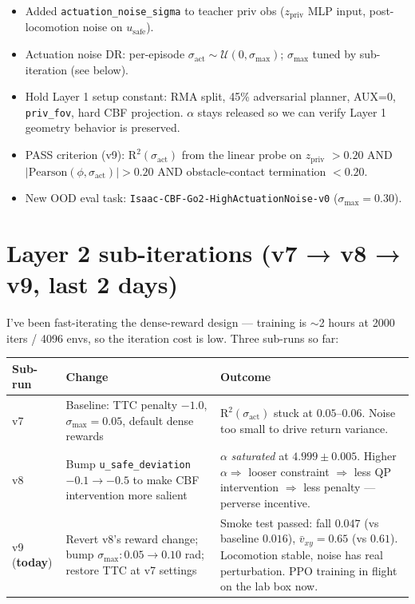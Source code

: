 \documentclass[11pt]{article}
\begin{document}
\begin{itemize}
\item Added \texttt{actuation\_noise\_sigma} to teacher priv obs ($z_\text{priv}$ MLP input, post-locomotion noise on $u_\text{safe}$).
\item Actuation noise DR: per-episode $\sigma_\text{act} \sim \mathcal{U}(0, \sigma_\text{max})$; $\sigma_\text{max}$ tuned by sub-iteration (see below).
\item Hold Layer 1 setup constant: RMA split, 45\% adversarial planner, AUX=0, \texttt{priv\_fov}, hard CBF projection. $\alpha$ stays released so we can verify Layer 1 geometry behavior is preserved.
\item PASS criterion (v9): $\text{R}^2(\sigma_\text{act})$ from the linear probe on $z_\text{priv}$ $> 0.20$ AND $|\text{Pearson}(\phi, \sigma_\text{act})| > 0.20$ AND obstacle-contact termination $< 0.20$.
\item New OOD eval task: \texttt{Isaac-CBF-Go2-HighActuationNoise-v0} ($\sigma_\text{max}=0.30$).
\end{itemize}

\section*{Layer 2 sub-iterations (v7 → v8 → v9, last 2 days)}

I've been fast-iterating the dense-reward design --- training is $\sim$2 hours at 2000 iters / 4096 envs, so the iteration cost is low. Three sub-runs so far:

\begin{center}
\begin{tabular}{@{}l p{1.6in} p{2.7in}@{}}
\toprule
Sub-run & Change                                            & Outcome \\
\midrule
v7 & Baseline: TTC penalty $-1.0$, $\sigma_\text{max}=0.05$, default dense rewards & $\text{R}^2(\sigma_\text{act})$ stuck at $0.05$--$0.06$. Noise too small to drive return variance. \\
v8 & Bump \texttt{u\_safe\_deviation} $-0.1 \to -0.5$ to make CBF intervention more salient & $\alpha$ \emph{saturated} at $4.999 \pm 0.005$. Higher $\alpha \Rightarrow$ looser constraint $\Rightarrow$ less QP intervention $\Rightarrow$ less penalty --- perverse incentive. \\
v9 (\textbf{today}) & Revert v8's reward change; bump $\sigma_\text{max}: 0.05 \to 0.10$ rad; restore TTC at v7 settings & Smoke test passed: fall $0.047$ (vs baseline $0.016$), $\bar v_{xy}=0.65$ (vs $0.61$). Locomotion stable, noise has real perturbation. PPO training in flight on the lab box now. \\
\bottomrule
\end{tabular}
\end{center}
\end{document}
